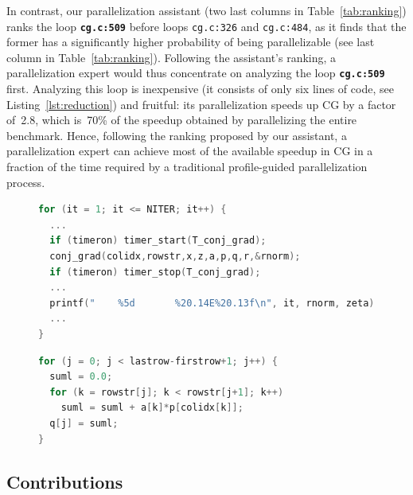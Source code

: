 In contrast, our parallelization assistant (two last columns in
Table~\ref{tab:ranking}) ranks the loop \textbf{\texttt{cg.c:509}} before
loops \texttt{cg.c:326} and \texttt{cg.c:484}, as it finds that the former has a
significantly higher probability of being parallelizable (see last column in
Table~\ref{tab:ranking}).
%
Following the assistant's ranking, a parallelization expert would thus
concentrate on analyzing the loop \textbf{\texttt{cg.c:509}} first.
%
Analyzing this loop is inexpensive (it consists of only six lines of code, see
Listing~\ref{lst:reduction}) and fruitful: its parallelization speeds up CG by a
factor of~2.8, which is~70\% of the speedup obtained by parallelizing the entire
benchmark.
%
Hence, following the ranking proposed by our assistant, a parallelization expert
can achieve most of the available speedup in CG in a fraction of the time
required by a traditional profile-guided parallelization process.

\begin{figure}[t]
\begin{lstlisting}[caption={\texttt{cg.c:326}. Longest running loop in CG. The loop cannot be parallelized due to
inter-iteration dependences and side effects caused by system calls.},label={lst:main_iter},language=C]
for (it = 1; it <= NITER; it++) {
  ...
  if (timeron) timer_start(T_conj_grad);
  conj_grad(colidx,rowstr,x,z,a,p,q,r,&rnorm);
  if (timeron) timer_stop(T_conj_grad);
  ...
  printf("    %5d       %20.14E%20.13f\n", it, rnorm, zeta);
  ...
}
\end{lstlisting}

\begin{lstlisting}[caption={\textbf{\texttt{cg.c:509}}. Longest running loop in CG among those \emph{that can be parallelized}.},label={lst:reduction},language=C]
for (j = 0; j < lastrow-firstrow+1; j++) {
  suml = 0.0;
  for (k = rowstr[j]; k < rowstr[j+1]; k++)
    suml = suml + a[k]*p[colidx[k]];
  q[j] = suml;
}
\end{lstlisting}
\end{figure}



\subsection{Contributions}

